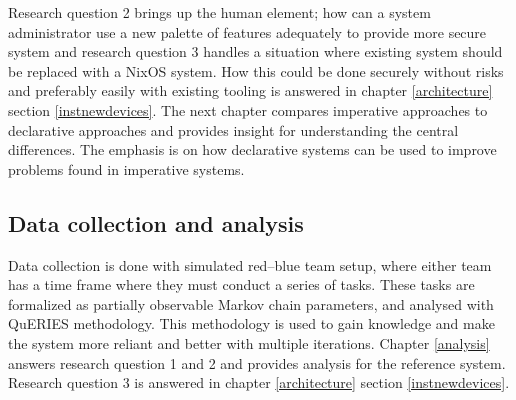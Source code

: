 Research question 2 brings up the human element; how can a system
administrator use a new palette of features adequately to provide more
secure system and research question 3 handles a situation where
existing system should be replaced with a NixOS system. How this
could be done securely without risks and preferably easily with
existing tooling is answered in chapter \ref{architecture}
section \ref{instnewdevices}. The next chapter compares imperative
approaches to declarative approaches and provides insight for
understanding the central differences. The emphasis is on how
declarative systems can be used to improve problems found in
imperative systems. 

\subsection{Data collection and analysis}

Data collection is done with simulated red–blue team setup, where
either team has a time frame where they must conduct a series of
tasks. These tasks are formalized as partially observable Markov chain
parameters, and analysed with QuERIES methodology. This methodology is
used to gain knowledge and make the system more reliant and better
with multiple iterations. Chapter \ref{analysis} answers research
question 1 and 2 and provides analysis for the reference
system. Research question 3 is answered in chapter \ref{architecture}
section \ref{instnewdevices}.
